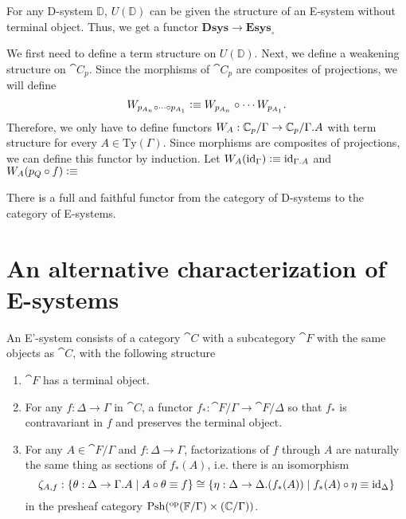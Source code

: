 \begin{defn}
For any D-system $\mathbb{D}$, $U(\mathbb{D})$ can be given the structure of
an E-system without terminal object. Thus, we get a functor
$\mathbf{Dsys}\to\mathbf{Esys}_{\circ}$
\end{defn}

\begin{constr}
We first need to define a term structure on $U(\mathbb{D})$. 
Next, we define a weakening structure on $\cat{C}_p$. Since the morphisms of
$\cat{C}_p$ are composites of projections, we will define
\begin{equation*}
W_{p_{A_n}\circ\cdots\circ p_{A_1}}\vcentcolon\equiv W_{p_{A_n}}\circ\cdots W_{p_{A_1}}.
\end{equation*}
Therefore, we only have to define functors 
$W_A:\cat{C}_p/\Gamma\to\cat{C}_p/\ctxext{\Gamma}{A}$ with term structure for every 
$A\in\mathrm{Ty}(\Gamma)$. Since morphisms are composites of projections, we
can define this functor by induction. Let $W_A(\catid{\Gamma})\defeq
\catid{\ctxext{\Gamma}{A}}$ and $W_A(p_Q\circ f)\vcentcolon\equiv$
\end{constr}

\begin{thm}
There is a full and faithful functor from the category of D-systems to the
category of E-systems.
\end{thm}

\section{An alternative characterization of E-systems}

\begin{defn}
An E'-system consists of a category $\cat{C}$ with a subcategory $\cat{F}$ with the
same objects as $\cat{C}$, with
the following structure
\begin{enumerate}
\item $\cat{F}$ has a terminal object.
\item For any $f:\Delta\to\Gamma$ in $\cat{C}$, a functor $f_\ast:\cat{F}/\Gamma\to
\cat{F}/\Delta$ %
so that $f_\ast$ is contravariant in $f$ and preserves the terminal object. 
\item For any $A\in\cat{F}/\Gamma$ and $f:\Delta\to\Gamma$, factorizations of
$f$ through $A$ are naturally the same thing as sections of
$f_\ast(A)$, i.e. there is an isomorphism
\begin{equation*}
\zeta_{A,f}%
:\{\theta:\Delta\to\ctxext{\Gamma}{A}\mid A\circ\theta\jdeq f\}
  \cong
\{\eta:\Delta\to\ctxext{\Delta}{(f_\ast(A))}\mid f_\ast(A)\circ\eta\jdeq\catid{\Delta}\}
\end{equation*}
in the presheaf category 
$\mathrm{Psh}(^{\mathrm{op}}{(\mathbb{F}/\Gamma)}\times(\mathbb{C}/\Gamma))$. 
\end{enumerate}
\end{defn}

